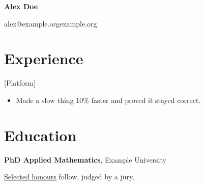 \documentclass[paper=letter,fontsize=10pt]{scrartcl}
\newlength{\sepunit}
\newcommand{\degree}[2]{\noindent\textbf{#1}, #2\par}
\begin{document}
\color{primary}

\begin{center}
    {\sffamily\bfseries\Huge \textcolor{primary}{Alex} Doe \par}
    \vspace{2\sepunit}
    {\color{muted} alex@example.org\dotsep example.org}
\end{center}

\section*{Experience}

[Platform]

\begin{itemize}
    \item Made a slow thing 10\% faster and proved it stayed correct.
\end{itemize}

\vspace{2\sepunit}

\section*{Education}

\degree{PhD Applied Mathematics}{Example University}

\ul{Selected honours} follow, judged  by a jury.
\end{document}
